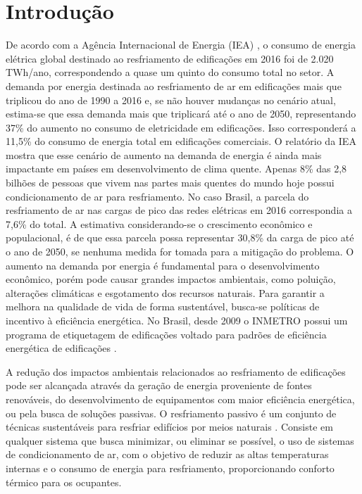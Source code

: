 \documentclass[brazil,hardcopy,openany,a5paper]{ufscthesis}
\begin{document}
	
	\frontmatter
	\folhaderosto[]%
	
	\mainmatter

	\chapter{Introdução}
	\label{chapter:introducao}
	
	De acordo com a Agência Internacional de Energia (IEA) \cite{IEA2018}, o consumo de energia elétrica global destinado ao resfriamento de edificações em 2016 foi de 2.020 TWh/ano, correspondendo a quase um quinto do consumo total no setor. A demanda por energia destinada ao resfriamento de ar em edificações mais que triplicou do ano de 1990 a 2016 e, se não houver mudanças no cenário atual, estima-se que essa demanda mais que triplicará até o ano de 2050, representando 37\% do aumento no consumo de eletricidade em edificações. Isso corresponderá a 11,5\% do consumo de energia total em edificações comerciais. O relatório da IEA mostra que esse cenário de aumento na demanda de energia é ainda mais impactante em países em desenvolvimento de clima quente. Apenas 8\% das 2,8 bilhões de pessoas que vivem nas partes mais quentes do mundo hoje possui condicionamento de ar para resfriamento. No caso Brasil, a parcela do resfriamento de ar nas cargas de pico das redes elétricas em 2016 correspondia a 7,6\% do total. A estimativa considerando-se o crescimento econômico e populacional, é de que essa parcela possa representar 30,8\% da carga de pico até o ano de 2050, se nenhuma medida for tomada para a mitigação do problema. O aumento na demanda por energia é fundamental para o desenvolvimento econômico, porém pode causar grandes impactos ambientais, como poluição, alterações climáticas e esgotamento dos recursos naturais. Para garantir a melhora na qualidade de vida de forma sustentável, busca-se políticas de incentivo à eficiência energética. No Brasil, desde 2009 o INMETRO possui um programa de etiquetagem de edificações voltado para padrões de eficiência energética de edificações \cite{BRASIL2009}.
	
	A redução dos impactos ambientais relacionados ao resfriamento de edificações pode ser alcançada através da geração de energia proveniente de fontes renováveis, do desenvolvimento de equipamentos com maior eficiência energética, ou pela busca de soluções passivas. O resfriamento passivo é um conjunto de técnicas sustentáveis para resfriar edifícios por meios naturais \cite{Samani2016}. Consiste em qualquer sistema que busca minimizar, ou eliminar se possível, o uso de sistemas de condicionamento de ar, com o objetivo de reduzir as altas temperaturas internas e o consumo de energia para resfriamento, proporcionando conforto térmico para os ocupantes.
	
\end{document}
